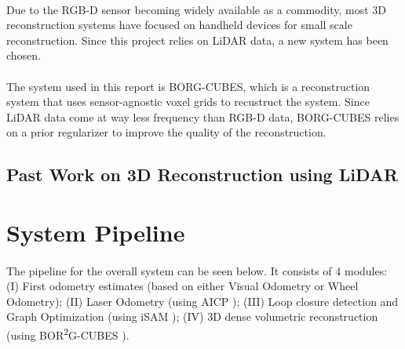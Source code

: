 \documentclass[11pt]{article}
\begin{document}
	\paragraph{}
	Due to the RGB-D sensor becoming widely available as a commodity, most 3D reconstruction systems have focused on handheld devices for small scale reconstruction. Since this project relies on LiDAR data, a new system has been chosen.	
	
	\paragraph{}
	The system used in this report is BORG-CUBES, which is a reconstruction system that uses sensor-agnostic	voxel grids to recustruct the system. Since LiDAR data come at way less frequency than RGB-D data, BORG-CUBES relies on a prior regularizer to improve the quality of the reconstruction.
	
	\subsection{Past Work on 3D Reconstruction using LiDAR}
	

	\newpage
	\section{System Pipeline} \label{pipeline}
	\paragraph{}
	The pipeline for the overall system can be seen below. It consists of 4 modules: (I) First odometry estimates (based on either Visual Odometry or Wheel Odometry); (II) Laser Odometry (using AICP \cite{7989547}); (III) Loop closure detection and Graph Optimization (using iSAM \cite{Kaess08tro}); (IV) 3D dense volumetric reconstruction (using BOR\textsuperscript{2}G-CUBES \cite{TannerFSR2015}\cite{TannerArXiv2016}).
\end{document}
